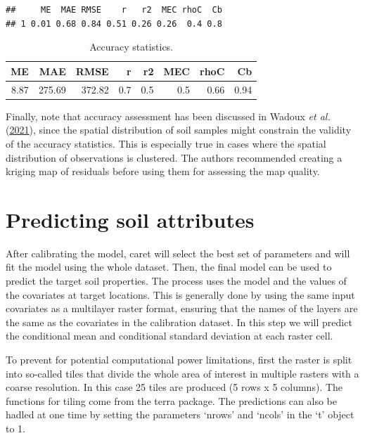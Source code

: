 \documentclass[
  10pt,
  b5paper,
  oneside]{book}
\begin{document}
\begin{verbatim}
##     ME  MAE RMSE    r   r2  MEC rhoC  Cb
## 1 0.01 0.68 0.84 0.51 0.26 0.26  0.4 0.8
\end{verbatim}

\begin{table}

\caption{\label{tab:unnamed-chunk-33}Accuracy statistics.}
\centering
\begin{tabular}[t]{rrrrrrrr}
\toprule
ME & MAE & RMSE & r & r2 & MEC & rhoC & Cb\\
\midrule
8.87 & 275.69 & 372.82 & 0.7 & 0.5 & 0.5 & 0.66 & 0.94\\
\bottomrule
\end{tabular}
\end{table}

Finally, note that accuracy assessment has been discussed in Wadoux \emph{et al.} (\protect\hyperlink{ref-Wadoux2021}{2021}), since the spatial distribution of soil samples might constrain the validity of the accuracy statistics. This is especially true in cases where the spatial distribution of observations is clustered. The authors recommended creating a kriging map of residuals before using them for assessing the map quality.

\hypertarget{predicting-soil-attributes}{%
\section{Predicting soil attributes}\label{predicting-soil-attributes}}

After calibrating the model, caret will select the best set of parameters and will fit the model using the whole dataset. Then, the final model can be used to predict the target soil properties. The process uses the model and the values of the covariates at target locations. This is generally done by using the same input covariates as a multilayer raster format, ensuring that the names of the layers are the same as the covariates in the calibration dataset. In this step we will predict the conditional mean and conditional standard deviation at each raster cell.

To prevent for potential computational power limitations, first the raster is split into so-called tiles that divide the whole area of interest in multiple rasters with a coarse resolution. In this case 25 tiles are produced (5 rows x 5 columns). The functions for tiling come from the terra package. The predictions can also be hadled at one time by setting the parameters `nrows' and `ncols' in the `t' object to 1.
\end{document}
